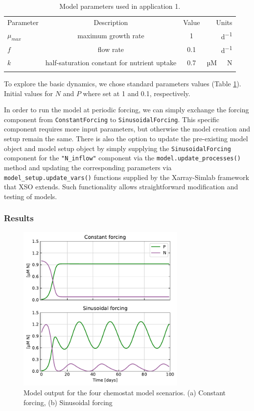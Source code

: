 \documentclass[journal abbreviation, manuscript]{copernicus}
\begin{document}
%
\begin{table}[t]
\caption{Model parameters used in application 1.}
\begin{tabular}{l c c r}
\tophline
Parameter & Description & Value & Units \\
\middlehline

$\mu_{max}$ & maximum growth rate & 1 & \unit{d^{-1}} \\
$f$ & flow rate & 0.1 & \unit{d^{-1}}\\
$k$ & half-saturation constant for nutrient uptake & 0.7 & \unit{µM \ N}\\

\bottomhline
\end{tabular}
\label{Table:UseCase1Parameters}
\end{table}
%

To explore the basic dynamics, we chose standard parameters values (Table \ref{Table:UseCase1Parameters}). Initial values for $N$ and $P$ where set at 1 and 0.1, respectively.

In order to run the model at periodic forcing, we can simply exchange the forcing component from \texttt{ConstantForcing} to \texttt{SinusoidalForcing}. This specific component requires more input parameters, but otherwise the model creation and setup remain the same. There is also the option to update the pre-existing model object and model setup object by simply supplying the \texttt{SinusoidalForcing} component for the \texttt{"N\_inflow"} component via the \texttt{model.update\_processes()} method and updating the corresponding parameters via \texttt{model\_setup.update\_vars()} functions supplied by the Xarray-Simlab framework that XSO extends. Such functionality allows straightforward modification and testing of models.

\subsubsection{Results}

\begin{figure}[t]
\includegraphics[width=8.3cm]{Figures/firstdraft_plots/01_chemostat_output.pdf}
\caption{Model output for the four chemostat model scenarios. (a) Constant forcing, (b) Sinusoidal forcing}
\label{Figure:ResultsChemostat}
\end{figure}
\end{document}

